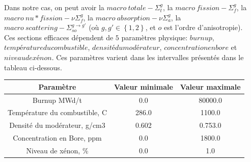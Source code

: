 Dans notre cas, on peut avoir la $macro\ totale-\Sigma_t^g$, la $macro\ fission-\Sigma_f^g$, la $macro\ nu*fission-\nu\Sigma_f^g$, la $macro\ absorption-\nu\Sigma_a^g$,
la $macro\ scattering-\Sigma_{so}^{g\rightarrow g'}$ (où $g,g' \in \left \{1,2\right\}$, et $o$ est l'ordre d'anisotropie).\\
Ces sections efficaces dépendent de $5$ paramètres physique: $burnup$, $température du combustible$, $densité du modérateur$, $concentration en bore$ et $niveau de xénon$.
Ces paramètres varient dans les intervalles présentés dans le tableau ci-dessous.\\

\begin{center}
\begin{tabular}{|*{3}{c|}}
	\hline
	Paramètre 											& Valeur minimale & Valeur maximale \\
	\hline
	Burnup MWd/t 										& 0.0 						& 80000.0 \\
	Température du combustible, C		& 286.0 					& 1100.0	\\
	Densité du modérateur, g/cm3 		& 0.602 					& 0.753.0 \\
	Concentration en Bore, ppm 			& 0.0 						& 1800.0 	\\
	Niveau de xénon, \% 						& 0.0 						& 1.0 		\\
	\hline
\end{tabular}
\end{center}

